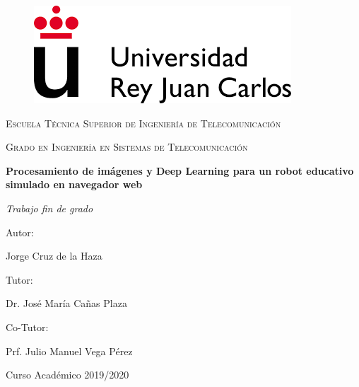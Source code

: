 \documentclass{report}
\begin{document}
\begin{titlepage}
\centering

\begin{figure}[t]
\includegraphics[scale=0.5]{images/urjc_logo.png}
\centering
\vspace{0.5cm} %
\end{figure}

{\scshape\Large Escuela Técnica Superior de Ingeniería de Telecomunicación \par}
\vspace{1cm}
{\scshape\Large Grado en Ingeniería en Sistemas de Telecomunicación \par}
\vspace{3cm}
{\bfseries\LARGE Procesamiento de imágenes y Deep Learning para un robot educativo simulado
en navegador web\par}
\vspace{3cm}
{\itshape\Large Trabajo fin de grado \par}
\vfill
{\Large Autor: }
{\Large Jorge Cruz de la Haza \par}
{\Large Tutor: }
{\Large Dr. José María Cañas Plaza \par}
{\Large Co-Tutor: }
{\Large Prf. Julio Manuel Vega Pérez \par}
\vfill
{\Large Curso Académico 2019/2020 \par}
\end{titlepage} 
\end{document}
